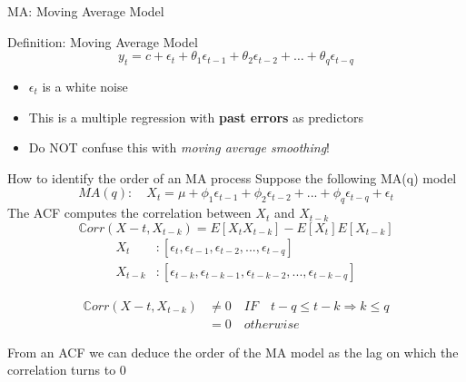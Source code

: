 \documentclass{beamer}
\begin{document}
\begin{frame}{MA: Moving Average Model}
  \begin{block}{Definition: Moving Average Model}
    \begin{equation*}
      y_t = c + \epsilon_t + \theta_1 \epsilon_{t-1} + \theta_2 \epsilon_{t-2} + \dots + \theta_q \epsilon_{t-q}
    \end{equation*}
    \begin{itemize}
    \item $\epsilon_t$ is a white noise
    \item This is a multiple regression with \textbf{past errors} as predictors
    \item Do NOT confuse this with \emph{moving average smoothing}!
    \end{itemize}    
  \end{block}

\end{frame}

\begin{frame}{How to identify the order of an MA process}
Suppose the following MA(q) model
$$MA(q):\quad X_t = \mu +\phi_1\epsilon_{t-1}+\phi_2\epsilon_{t-2}+...+\phi_q\epsilon_{t-q}+\epsilon_{t}$$
The ACF computes the correlation between $X_t$ and $X_{t-k}$
$$ \mathbb{C}orr(X-t, X_{t-k}) = E[X_tX_{t-k}] - E[X_t]E[X_{t-k}]$$
\begin{align*}
X_t &:[\epsilon_t, \epsilon_{t-1}, \epsilon_{t-2}, ..., \epsilon_{t-q}] \\
X_{t-k}&:[\epsilon_{t-k}, \epsilon_{t-k-1}, \epsilon_{t-k-2}, ..., \epsilon_{t-k-q}]
\end{align*}

\begin{align*}
\mathbb{C}orr(X-t, X_{t-k}) & \neq 0 \quad IF  \quad t-q \leq t-k \Rightarrow k \leq q \\
                   & = 0 \quad otherwise
\end{align*}

From an ACF we can deduce the order of the MA model as the lag on which the correlation turns to 0
\end{frame}
\end{document}
